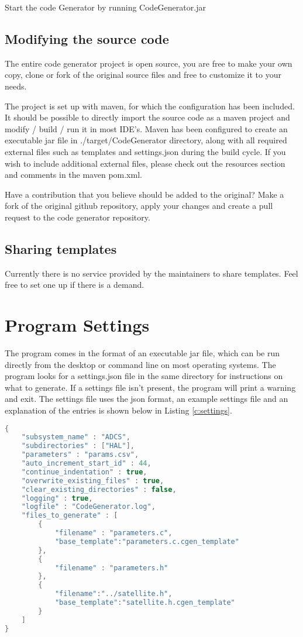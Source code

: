 \documentclass{settings/TU_Delft_Report}
\begin{document}
\vsp Start the code Generator by running CodeGenerator.jar

\section{Modifying the source code}
The entire code generator project is open source, you are free to make your own copy, clone or fork of the original source files and free to customize it to your needs.\vsp

The project is set up with maven, for which the configuration has been included. It should be possible to directly import the source code as a maven project and modify / build / run it in most IDE's. Maven has been configured to create an executable jar file in ./target/CodeGenerator directory, along with all required external files such as templates and settings.json during the build cycle. If you wish to include additional external files, please check out the resources section and comments in the maven pom.xml.\vsp

Have a contribution that you believe should be added to the original? Make a fork of the original github repository, apply your changes and create a pull request to the code generator repository.

\section{Sharing templates}
Currently there is no service provided by the maintainers to share templates. Feel free to set one up if there is a demand.

\chapter{Program Settings}
The program comes in the format of an executable jar file, which can be run directly from the desktop or command line on most operating systems. The program looks for a settings.json file in the same directory for instructions on what to generate. If a settings file isn't present, the program will print a warning and exit. The settings file uses the json format, an example settings file and an explanation of the entries is shown below in Listing \ref{c:settings}.

\begin{lstlisting}[caption={settings.json},label={c:settings},language=Java]
{
	"subsystem_name" : "ADCS",
	"subdirectories" : ["HAL"],
	"parameters" : "params.csv",
	"auto_increment_start_id" : 44,
	"continue_indentation" : true,
	"overwrite_existing_files" : true,
	"clear_existing_directories" : false,
	"logging" : true,
	"logfile" : "CodeGenerator.log",
	"files_to_generate" : [
		{
			"filename" : "parameters.c",
			"base_template":"parameters.c.cgen_template"
		},
		{
			"filename" : "parameters.h"
		},
		{
		    "filename":"../satellite.h",
		    "base_template":"satellite.h.cgen_template"
	    }
	]
}
\end{lstlisting}
\end{document}
